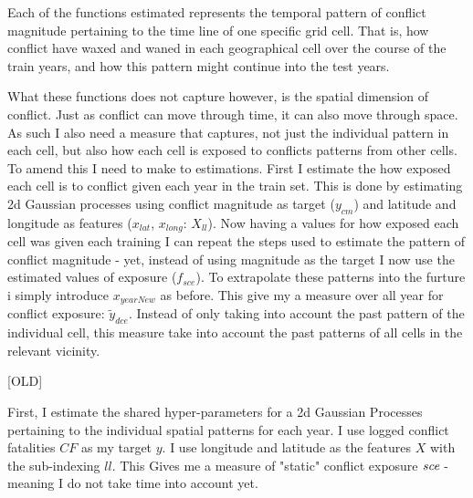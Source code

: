 \documentclass[a4paper]{article}
\begin{document}
Each of the functions estimated represents the temporal pattern of conflict magnitude pertaining to the time line of one specific grid cell. That is, how conflict have waxed and waned in each geographical cell over the course of the train years, and how this pattern might continue into the test years. 


What these functions does not capture however, is the spatial dimension of conflict. Just as conflict can move through time, it can also move through space. As such I also need a measure that captures, not just the individual pattern in each cell, but also how each cell is exposed to conflicts patterns from other cells. To amend this I need to make to estimations. First I estimate the how exposed each cell is to conflict given each year in the train set. This is done by estimating 2d Gaussian processes using conflict magnitude as target ($y_{cm}$) and latitude and longitude as features ($x_{lat}$, $x_{long}$: $X_{ll}$). Now having a values for how exposed each cell was given each training I can repeat the steps used to estimate the pattern of conflict magnitude - yet, instead of using magnitude as the target I now use the estimated values of exposure ($f_{sce}$). To extrapolate these patterns into the furture i simply introduce $x_{yearNew}$ as before. This give my a measure over all year for conflict exposure: $\tilde{y}_{dce}$. Instead of only taking into account the past pattern of the individual cell, this measure take into account the past patterns of all cells in the relevant vicinity.\par 






[OLD]
















First, I estimate the shared hyper-parameters for a 2d Gaussian Processes pertaining to the individual spatial patterns for each year. I use logged conflict fatalities $CF$ as my target $y$. I use longitude and latitude as the features $X$ with the sub-indexing $ll$. This Gives me a measure of "static" conflict exposure $\emph{sce}$ - meaning I do not take time into account yet.\par
\end{document}
